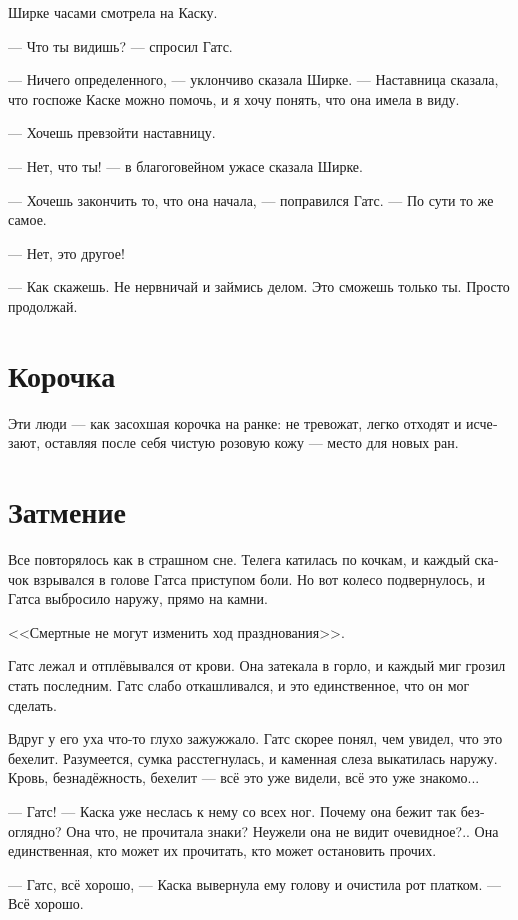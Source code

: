 \documentclass[a4paper,12pt,fleqn]{book}\usepackage{polyglossia}\setdefaultlanguage[babelshorthands=true]{russian}\setotherlanguage{english}\defaultfontfeatures{Ligatures=TeX,Mapping=tex-text}\usepackage{xcolor}\newcommand{\ml}[3]{#2}
\begin{document}
Ширке часами смотрела на Каску.

--- Что ты видишь? --- спросил Гатс.

--- Ничего определенного, --- уклончиво сказала Ширке.
--- Наставница сказала, что госпоже Каске можно помочь, и я хочу понять, что она имела в виду.

--- Хочешь превзойти наставницу.

--- Нет, что ты! --- в благоговейном ужасе сказала Ширке.

--- Хочешь закончить то, что она начала, --- поправился Гатс.
--- По сути то же самое.

--- Нет, это другое!

--- Как скажешь.
Не нервничай и займись делом.
Это сможешь только ты.
Просто продолжай.

\section{Корочка}

Эти люди --- как засохшая корочка на ранке: не тревожат, легко отходят и исчезают, оставляя после себя чистую розовую кожу --- место для новых ран.

\section{Затмение}

Все повторялось как в страшном сне.
Телега катилась по кочкам, и каждый скачок взрывался в голове Гатса приступом боли.
Но вот колесо подвернулось, и Гатса выбросило наружу, прямо на камни.

<<Смертные не могут изменить ход празднования>>.

Гатс лежал и отплёвывался от крови.
Она затекала в горло, и каждый миг грозил стать последним.
Гатс слабо откашливался, и это единственное, что он мог сделать.

Вдруг у его уха что-то глухо зажужжало.
Гатс скорее понял, чем увидел, что это бехелит.
Разумеется, сумка расстегнулась, и каменная слеза выкатилась наружу.
Кровь, безнадёжность, бехелит --- всё это уже видели, всё это уже знакомо...

--- Гатс! --- Каска уже неслась к нему со всех ног.
Почему она бежит так безоглядно?
Она что, не прочитала знаки?
Неужели она не видит очевидное?..
Она единственная, кто может их прочитать, кто может остановить прочих.

--- Гатс, всё хорошо, --- Каска вывернула ему голову и очистила рот платком.
--- Всё хорошо.
\end{document}
